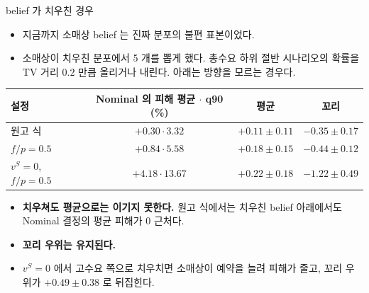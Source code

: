 \documentclass[aspectratio=169,11pt]{beamer}
\begin{document}
\begin{frame}{belief 가 치우친 경우}
\begin{itemize}
  \item 지금까지 소매상 belief 는 진짜 분포의 불편 표본이었다.
  \item 소매상이 치우친 분포에서 5 개를 뽑게 했다. 총수요 하위 절반 시나리오의 확률을 TV 거리 $0.2$ 만큼 올리거나 내린다. 아래는 방향을 모르는 경우다.
\end{itemize}
\begin{center}
\footnotesize
\begin{tabular}{lccc}
\toprule
설정 & Nominal 의 피해 평균 $\cdot$ q90 (\%) & 평균 & 꼬리\\
\midrule
원고 식 & $+0.30 \cdot 3.32$ & $+0.11 \pm 0.11$ & $-0.35 \pm 0.17$\\
$f/p = 0.5$ & $+0.84 \cdot 5.58$ & $+0.18 \pm 0.15$ & $-0.44 \pm 0.12$\\
$v^{S} = 0$, $f/p = 0.5$ & $+4.18 \cdot 13.67$ & $+0.22 \pm 0.18$ & $-1.22 \pm 0.49$\\
\bottomrule
\end{tabular}
\end{center}
\begin{itemize}
  \item \textbf{치우쳐도 평균으로는 이기지 못한다.} 원고 식에서는 치우친 belief 아래에서도 Nominal 결정의 평균 피해가 $0$ 근처다.
  \item \textbf{꼬리 우위는 유지된다.}
  \item $v^{S} = 0$ 에서 고수요 쪽으로 치우치면 소매상이 예약을 늘려 피해가 줄고, 꼬리 우위가 $+0.49 \pm 0.38$ 로 뒤집힌다.
\end{itemize}
\end{frame}
\end{document}
